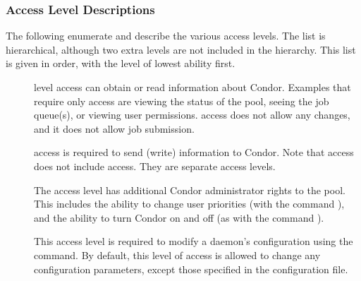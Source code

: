 \subsubsection{\label{sec:Security-access-levels} Access Level Descriptions}
The following enumerate and describe the various access levels.
The list is hierarchical, although two extra levels are
not included in the hierarchy.
This list is given in order, with the level of lowest ability first.

\begin{description}

\item[] \label{dcperm:read}  level
   access can obtain or read information about Condor.
   Examples that require only  access are
   viewing the status of the pool, seeing the job queue(s),
   or viewing user permissions.
    access does not allow any
   changes, and it does not allow job submission.

\item[] \label{dcperm:write}  access
   is required to send (write) information to Condor.
   Note that  access does not include  access.
   They are separate access levels.

\item[] \label{dcperm:administrator} The
    access level has additional Condor
   administrator rights to the pool.  This includes the ability to
   change user priorities (with the command ),
   and the ability to turn Condor on and off
   (as with the command ).

\item[] \label{dcperm:config} This access level is
   required to modify a daemon's configuration using
   the  command.
   By default, this level of access is allowed
   to change any configuration parameters, except those specified in
   the  configuration file.

\item[] \label{dcperm:config} 

\end{description}

